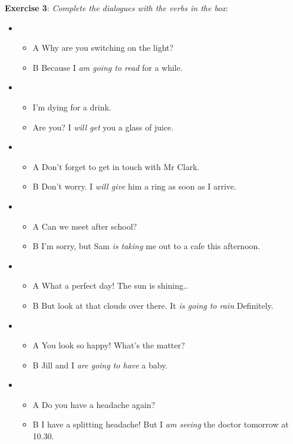 \textbf{Exercise 3}: \textit{Complete the dialogues with the verbs in the box}:

\begin{itemize}

\item
\begin{itemize}
\item A Why are you switching on the light?
\item B Because I \textit{am going to read} for a while.
\end{itemize}

\item
\begin{itemize}
\item I'm dying for a drink.
\item Are you? I \textit{will get} you a glass of juice.
\end{itemize}

\item
\begin{itemize}
\item A Don't forget to get in touch with Mr Clark.
\item B Don't worry. I \textit{will give} him a ring as soon as I arrive.
\end{itemize}

\item
\begin{itemize}
\item A Can we meet after school?
\item B I'm sorry, but Sam \textit{is taking} me out to a cafe this afternoon.
\end{itemize}

\item
\begin{itemize}
\item A What a perfect day! The sun is shining..
\item B But look at that clouds over there. It \textit{is going to rain} Definitely.
\end{itemize}

\item
\begin{itemize}
\item A You look so happy! What's the matter?
\item B Jill and I \textit{are going to have} a baby.
\end{itemize}

\item
\begin{itemize}
\item A Do you have a headache again?
\item B I have a splitting headache! But I \textit{am seeing} the doctor tomorrow at 10.30.
\end{itemize}


\end{itemize}
